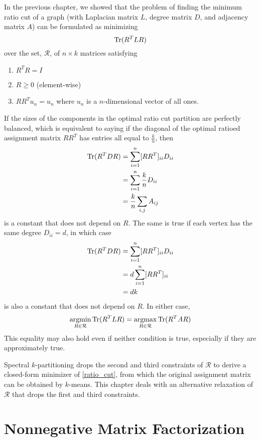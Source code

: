 In the previous chapter, we showed that the problem of finding the
minimum ratio cut of a graph (with Laplacian matrix $L$, degree matrix
$D$, and adjacency matrix $A$) can be formulated as minimizing
\begin{equation} \label{ratio_cut}
\operatorname{Tr}(R^T L R)
\end{equation}
over the set, $\mathcal{R}$, of $n \times k$ matrices satisfying
\begin{enumerate}
\item
$R^T R = I$

\item
$R \geq 0$ (element-wise)

\item
$R R^T u_n = u_n$ where $u_n$ is a $n$-dimensional vector of all ones.
\end{enumerate}

If the sizes of the components in the optimal ratio cut partition
are perfectly balanced, which is equivalent to saying if the diagonal
of the optimal ratioed assignment matrix $R R^T$ has entries all
equal to $\frac{k}{n}$, then
\begin{align*}
\operatorname{Tr}(R^T D R) &= \sum_{i=1}^n [R R^T]_{ii} D_{ii} \\
             &= \sum_{i=1}^n \frac{k}{n} D_{ii} \\
             &= \frac{k}{n} \sum_{i,j} A_{ij}
\end{align*}
is a constant that does not depend on $R$. The same is true if each
vertex has the same degree $D_{ii} = d$, in which case
\begin{align*}
\operatorname{Tr}(R^T D R) &= \sum_{i=1}^n [R R^T]_{ii} D_{ii} \\
             &= d \sum_{i=1}^n [R R^T]_{ii} \\ 
             &= d k
\end{align*}
is also a constant that does not depend on $R$. In either case,
\[ \underset{R \in \mathcal{R}}{\mathrm{arg min}} \operatorname{Tr}(R^T L R)
 = \underset{R \in \mathcal{R}}{\mathrm{arg max}} \operatorname{Tr}(R^T A R) \]
This equality may also hold even if neither condition is true,
especially if they are approximately true.

Spectral $k$-partitioning drops the second and third constraints
of $\mathcal{R}$ to derive a closed-form minimizer of \ref{ratio_cut},
from which the original assignment matrix can be obtained by $k$-means.
This chapter deals with an alternative relaxation of $\mathcal{R}$ that
drops the first and third constraints.

\section{Nonnegative Matrix Factorization}

